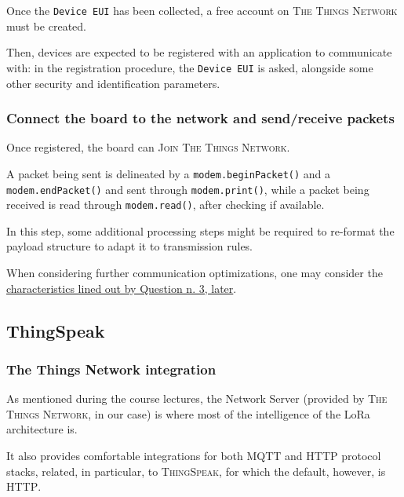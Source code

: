 \documentclass[a4paper,11pt]{article} %
\begin{document}
    Once the \texttt{Device EUI} has been collected, a free account on \textsc{The Things Network} must be created.

    \smallskip

    Then, devices are expected to be registered with an application to communicate with: in the registration procedure, the \texttt{Device EUI} is asked, alongside some other security and identification parameters.

    \subsubsection{Connect the board to the network and send/receive packets}

    Once registered, the board can \textsc{Join} \textsc{The Things Network}.

    \smallskip

    A packet being sent is delineated by a \texttt{modem.beginPacket()} and a \texttt{modem.endPacket()} and sent through \texttt{modem.print()}, while a packet being received is read through \texttt{modem.read()}, after checking if available.

    \medskip

    In this step, some additional processing steps might be required to re-format the payload structure to adapt it to transmission rules.

    \medskip

    When considering further communication optimizations, one may consider the \hyperref[sec:question-n.-3]{characteristics lined out by Question n. 3, later}.

    \subsection{ThingSpeak}\label{subsec:thingspeak}

    \subsubsection{The Things Network integration}

    As mentioned during the course lectures, the Network Server (provided by \textsc{The Things Network}, in our case) is where most of the intelligence of the LoRa architecture is.

    \smallskip

    It also provides comfortable integrations for both MQTT and HTTP protocol stacks, related, in particular, to \textsc{ThingSpeak}, for which the default, however, is \textsc{HTTP}.
\end{document}
